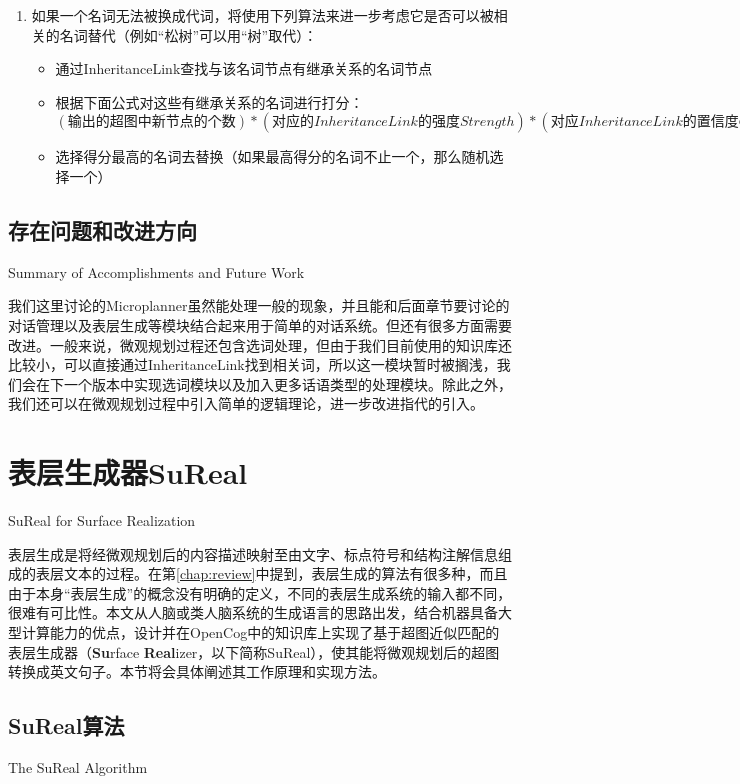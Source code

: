 \begin{enumerate}
\item 如果一个名词无法被换成代词，将使用下列算法来进一步考虑它是否可以被相关的名词替代（例如“松树”可以用“树”取代）：

\begin{itemize}
\item 通过InheritanceLink查找与该名词节点有继承关系的名词节点
\item 根据下面公式对这些有继承关系的名词进行打分：
    $(输出的超图中新节点的个数) * (对应的InheritanceLink的强度Strength) * (对应InheritanceLink的置信度Confidence)$
\item 选择得分最高的名词去替换（如果最高得分的名词不止一个，那么随机选择一个）
\end{itemize}
\end{enumerate}


\subsection{存在问题和改进方向}{Summary of Accomplishments and Future Work}

我们这里讨论的Microplanner虽然能处理一般的现象，并且能和后面章节要讨论的对话管理以及表层生成等模块结合起来用于简单的对话系统。但还有很多方面需要改进。一般来说，微观规划过程还包含选词处理，但由于我们目前使用的知识库还比较小，可以直接通过InheritanceLink找到相关词，所以这一模块暂时被搁浅，我们会在下一个版本中实现选词模块以及加入更多话语类型的处理模块。除此之外，我们还可以在微观规划过程中引入简单的逻辑理论，进一步改进指代的引入。


\section{表层生成器SuReal}{SuReal for Surface Realization}

表层生成是将经微观规划后的内容描述映射至由文字、标点符号和结构注解信息组成的表层文本的过程。在第\ref{chap:review}中提到，表层生成的算法有很多种，而且由于本身“表层生成”的概念没有明确的定义，不同的表层生成系统的输入都不同，很难有可比性。本文从人脑或类人脑系统的生成语言的思路出发，结合机器具备大型计算能力的优点，设计并在OpenCog中的知识库上实现了基于超图近似匹配的表层生成器（{\bf Su}rface {\bf Real}izer，以下简称SuReal），使其能将微观规划后的超图转换成英文句子。本节将会具体阐述其工作原理和实现方法。

\subsection{SuReal算法}{The SuReal Algorithm}


